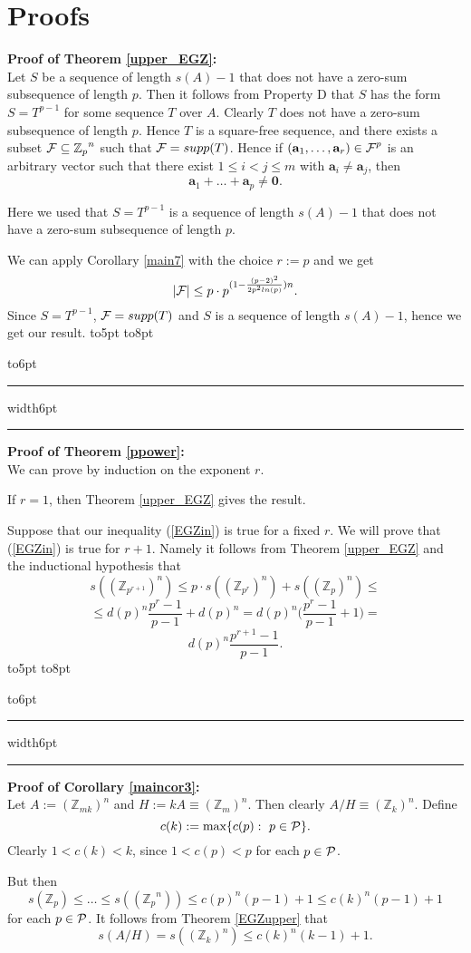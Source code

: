 \documentclass[12pt]{article}
\newcommand{\openbox}{\leavevmode
  \hbox to8pt{\hfil\vrule\vbox to6pt{\hrule width6pt\vfil\hrule}\vrule}}
\newcommand{\qed}{\hbox to5pt{ } \hfill \openbox\bigskip\medskip}
\newcommand{\Zp}{\mathbb Z _p}
\newcommand{\cF}{\mbox{$\cal F$}}
\newcommand{\cP}{\mbox{$\cal P$}}
\newcommand{\ve}[1]{\mathbf{#1}}
\newcommand{\Z}{\mathbb Z}
\begin{document}
\section{Proofs}



{\bf Proof of Theorem \ref{upper_EGZ}:}\\

Let $S$ be a sequence of length $s(A)-1$ that does not have a zero-sum subsequence of length $p$. Then  
it follows from Property D that $S$ has the form $S=T^{p-1}$ for some sequence $T$ over $A$. Clearly $T$ does not have a zero-sum subsequence of length $p$. Hence $T$ is a square-free sequence, and there exists a 
subset  $\cF\subseteq {\Zp}^n$ such that $\cF=supp(T)$. Hence  if $(\ve a_1, \ldots, \ve a_{r})\in {\cF}^{p}$ is an arbitrary vector such that 
there exist $1\leq i<j\leq m$ with $\ve a_i\ne \ve a_j$, then 
$$
\ve a_1+ \ldots +\ve a_p \ne \ve 0.
$$

Here we used that $S=T^{p-1}$ is a sequence of length $s(A)-1$ that does not have a zero-sum subsequence of length $p$.

We can apply Corollary \ref{main7} with the choice $r:=p$ and we get
$$
|\cF|\leq p\cdot p^{(1-\frac{(p-2)^2}{2 p^2ln(p)})n}.
$$
Since  $S=T^{p-1}$, $\cF=supp(T)$ and $S$ is a sequence of length $s(A)-1$, hence we get our result.  
\qed

{\bf Proof of Theorem \ref{ppower}:}\\

We can prove by induction on the exponent $r$.

If $r=1$, then Theorem \ref{upper_EGZ} gives the result.

Suppose that our inequality (\ref{EGZin}) is true for  a  fixed $r$. We will prove that (\ref{EGZin}) is true for $r+1$. 
Namely it follows from Theorem \ref{upper_EGZ} and the inductional hypothesis that 
$$
s(({\Z}_{p^{r+1}})^n) \leq p\cdot s(({\Z}_{p^r})^n) + s(({\Z}_{p})^n)\leq 
$$
$$
\leq d(p)^n \frac{p^r-1}{p-1} + d(p)^n=   d(p)^n \Big(  \frac{p^r-1}{p-1}  +1\Big)=
$$
$$
d(p)^n \frac{p^{r+1}-1}{p-1}.
$$
\qed

{\bf Proof of Corollary \ref{maincor3}:}\\

Let $A:=({\Z}_{mk})^n$ and $H:=kA \equiv ({\Z}_{m})^n$. Then clearly $A/H \equiv ({\Z}_{k})^n$. 
Define
$$
c(k):=\mbox{max}\{c(p):~ p\in \cP \}.
$$
Clearly $1<c(k)<k$, since $1<c(p)<p$ for each $p\in \cP$.

But then 
$$
s({\Zp})\leq \ldots \leq s(({\Zp}^n)) \leq c(p)^n(p-1)+1\leq c(k)^n(p-1)+1
$$
for each $p\in \cP$. It follows from Theorem \ref{EGZupper} that 
$$
s(A/H)=s(({\Z}_{k})^n)\leq c(k)^n(k-1)+1.
$$
\end{document}
